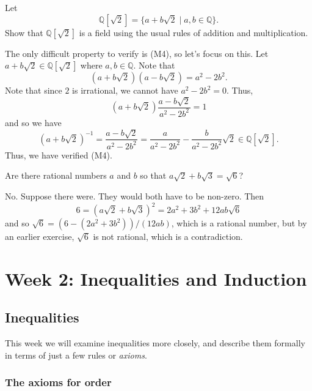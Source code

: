 \documentclass[11pt,dvipsnames]{book}
\numberwithin{figure}{section} %
\numberwithin{table}{section} %
\begin{document}
\begin{exercise}
Let
\[
\mathbb{Q}[\sqrt{2}] = \{a+b\sqrt{2}\; |\; a,b\in\mathbb{Q}\}.
\]
Show that $\mathbb{Q}[\sqrt{2}] $ is a field using the usual rules of addition and multiplication.
\end{exercise}

\begin{solution}
The only difficult property to verify is (M4), so let's focus on this. Let $a+b\sqrt{2}\in \mathbb{Q}[\sqrt{2}]$ where $a,b\in\mathbb{Q}$. Note that
\[
(a+b\sqrt{2})(a-b\sqrt{2})=a^2-2b^2.
\]
Note that since $2$ is irrational, we cannot have $a^2-2b^2=0$. Thus,
\[
(a+b\sqrt{2}) \frac{a-b\sqrt{2}}{a^2-2b^2}=1
\]
and so we have
\[
(a+b\sqrt{2})^{-1}
=\frac{a-b\sqrt{2}}{a^2-2b^2}
=\frac{a}{a^2-2b^2}-\frac{b}{a^2-2b^2}\sqrt{2} \in\mathbb{Q}[\sqrt{2}].\]
Thus, we have verified (M4).
\end{solution}

\begin{exercise}
Are there rational numbers $a$ and $b$ so that $a\sqrt{2}+b\sqrt{3}=\sqrt{6}$?
\begin{solution}
No. Suppose there were. They would both have to be non-zero. Then
\[
6=(a\sqrt{2}+b\sqrt{3})^2=2a^2+3b^2+12ab\sqrt{6}
\]
and so $\sqrt{6} = (6-(2a^2+3b^2))/(12ab)$, which is a rational number, but by an earlier exercise, $\sqrt{6}$ is not rational, which is a contradiction.
\end{solution}
\end{exercise}


\part{Week 2: Inequalities and Induction}

\chapter{Inequalities}%
\label{inequalities}

This week we will examine inequalities more closely, and describe them formally in terms of just a few rules or {\it axioms}.

\section{The axioms for order}%
\label{orderaxioms}
\end{document}
